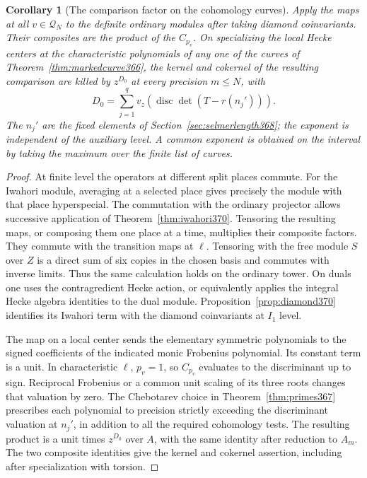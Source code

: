 \documentclass[a4paper,11pt]{article}
\newtheorem{corollary}[proposition]{Corollary}
\theoremstyle{definition}
\theoremstyle{remark}
\numberwithin{equation}{section}
\begin{document}
\begin{corollary}[The comparison factor on the cohomology curves]
\label{cor:levelcurve370}
Apply the maps at all \(v\in\mathcal Q_N\) to the definite
ordinary modules after taking diamond coinvariants. Their
composites are the product of the \(C_{p_v}\). On specializing
the local Hecke centers at the characteristic polynomials
of any one of the curves of Theorem~\ref{thm:markedcurve366},
the kernel and cokernel of the resulting comparison are
killed by \(z^{D_0}\) at every precision \(m\le N\), with
\[
       D_0=\sum_{j=1}^{q}v_z\!\left(
         \operatorname{disc}\det(T-r(n_j'))\right).
\]
The \(n_j'\) are the fixed elements of
Section~\ref{sec:selmerlength368}; the exponent is independent
of the auxiliary level. A common exponent is obtained on the
interval by taking the maximum over the finite list of curves.
\end{corollary}
\begin{proof}
At finite level the operators at different split places
commute. For the Iwahori module, averaging at a selected
place gives precisely the module with that place hyperspecial.
The commutation with the ordinary projector allows successive
application of Theorem~\ref{thm:iwahori370}. Tensoring the
resulting maps, or composing them one place at a time,
multiplies their composite factors. They commute with the
transition maps at \(\ell\). Tensoring with the free module
\(S\) over \(Z\) is a direct sum of six copies in the chosen
basis and commutes with inverse limits. Thus the same
calculation holds on the ordinary tower. On duals one uses
the contragredient Hecke action, or equivalently applies the
integral Hecke algebra identities to the dual module.
Proposition~\ref{prop:diamond370} identifies its Iwahori
term with the diamond coinvariants at \(I_1\) level.

The map on a local center sends the elementary symmetric
polynomials to the signed coefficients of the indicated monic
Frobenius polynomial. Its constant term is a unit. In
characteristic \(\ell\), \(p_v=1\), so \(C_{p_v}\) evaluates
to the discriminant up to sign. Reciprocal Frobenius or a
common unit scaling of its three roots changes that valuation
by zero. The Chebotarev choice in Theorem~\ref{thm:primes367}
prescribes each polynomial to precision strictly exceeding
the discriminant valuation at \(n_j'\), in addition to all
the required cohomology tests. The resulting product is a
unit times \(z^{D_0}\) over \(A\), with the same identity
after reduction to \(A_m\). The two composite identities
give the kernel and cokernel assertion, including after
specialization with torsion.
\end{proof}
\end{document}
